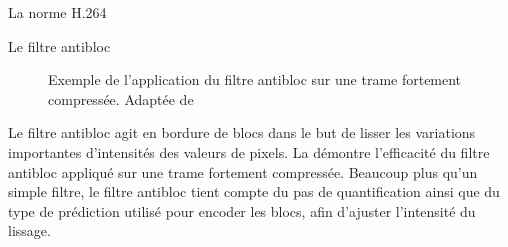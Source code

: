 \begin{chapter}{La norme H.264}
\begin{section}{Le filtre antibloc}
\begin{figure}
	\caption[Filtre antibloc appliqué à une trame fortement compressée] 
	{Exemple de l'application du filtre antibloc sur une trame fortement
	compressée. Adaptée de \citet[p.~7]{schafer2003}}
	\label{fig-Deblocking}
\end{figure}

Le filtre antibloc agit en bordure de blocs dans le but de lisser les
variations importantes d'intensités des valeurs de pixels. La
 démontre l'efficacité du filtre antibloc appliqué sur une
trame fortement compressée. Beaucoup plus qu'un simple filtre, le filtre
antibloc tient compte du pas de quantification ainsi que du type de prédiction
utilisé pour encoder les blocs, afin d'ajuster l'intensité du lissage.


\end{section}
\end{chapter}
